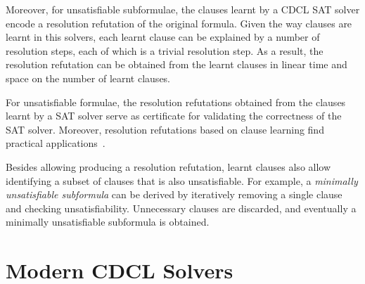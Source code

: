Moreover, for unsatisfiable subformulae, the clauses learnt by a CDCL SAT solver
encode a resolution refutation of the original formula. Given the way clauses
are learnt in this solvers, each learnt clause can be explained by a number of
resolution steps, each of which is a trivial resolution step. As a result, the
resolution refutation can be obtained from the learnt clauses in linear time and
space on the number of learnt clauses. 

For unsatisfiable formulae, the resolution refutations obtained from the clauses
learnt by a SAT solver serve as certificate for validating the correctness of
the SAT solver. Moreover, resolution refutations based on clause learning find
practical applications~\cite{cdclchapter}.

Besides allowing producing a resolution refutation, learnt clauses also allow
identifying a subset of clauses that is also unsatisfiable. For example, a
\emph{minimally unsatisfiable subformula} can be derived by iteratively removing
a single clause and checking unsatisfiability. Unnecessary clauses are
discarded, and eventually a minimally unsatisfiable subformula is obtained.

\section{Modern CDCL Solvers}
\label{sec:minisat}

